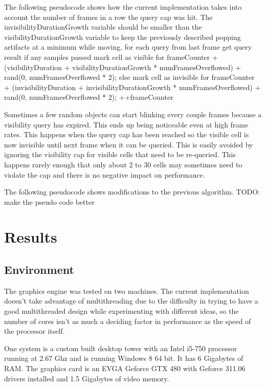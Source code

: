 \documentclass[12pt]{ucthesis}
\begin{document}
The following pseudocode shows how the current implementation takes into account the number of frames in a row the query cap was hit.  The invisibilityDurationGrowth variable should be smaller than the visibilityDurationGrowth variable to keep the previously described popping artifacts at a minimum while moving.
for each query from last frame
	get query result
	if any samples passed
		mark cell as visible for frameCounter + (visibilityDuration + visibilityDurationGrowth * numFramesOverflowed) + rand(0, numFramesOverflowed * 2);
	else
		mark cell as invisible for frameCounter + (invisibilityDuration + invisibilityDurationGrowth * numFramesOverflowed) + rand(0, numFramesOverflowed * 2);
++frameCounter

Sometimes a few random objects can start blinking every couple frames because a visibility query has expired.  This ends up being noticeable even at high frame rates.  This happens when the query cap has been reached so the visible cell is now invisible until next frame when it can be queried.  This is easily avoided by ignoring the visibility cap for visible cells that need to be re-queried.  This happens rarely enough that only about 2 to 30 cells may sometimes need to violate the cap and there is no negative impact on performance.

The following pseudocode shows modifications to the previous algorithm.
TODO: make the pseudo code better


\chapter{Results}
\label{results}

\section{Environment}
\label{environment}

The graphics engine was tested on two machines.
The current implementation doesn't take advantage of multithreading due to the difficulty in trying to have a good multithreaded design while experimenting with different ideas, so the number of cores isn't as much a deciding factor in performance as the speed of the processor itself.

One system is a custom built desktop tower with an Intel i5-750 processor running at 2.67 Ghz and is running Windows 8 64 bit.
It has 6 Gigabytes of RAM.
The graphics card is an EVGA Geforce GTX 480 with Geforce 311.06 drivers installed and 1.5 Gigabytes of video memory.
\end{document}
